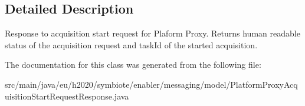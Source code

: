 \subsection{Detailed Description}
Response to acquisition start request for Plaform Proxy. Returns human readable status of the acquisition request and task\+Id of the started acquisition. 

The documentation for this class was generated from the following file\+:\begin{DoxyCompactItemize}
\item 
src/main/java/eu/h2020/symbiote/enabler/messaging/model/Platform\+Proxy\+Acquisition\+Start\+Request\+Response.\+java\end{DoxyCompactItemize}

